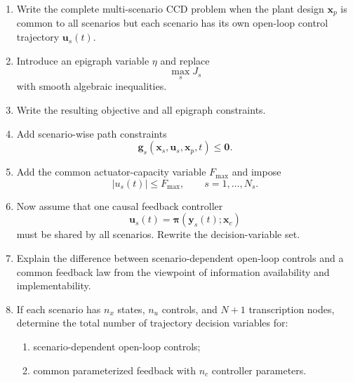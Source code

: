 \begin{enumerate}
    \item Write the complete multi-scenario CCD problem when the plant
    design $\mathbf{x}_p$ is common to all scenarios but each scenario has
    its own open-loop control trajectory $\mathbf{u}_s(t)$.

    \item Introduce an epigraph variable $\eta$ and replace
    \begin{equation}
    \max_s J_s
    \end{equation}
    with smooth algebraic inequalities.

    \item Write the resulting objective and all epigraph constraints.

    \item Add scenario-wise path constraints
    \begin{equation}
    \mathbf{g}_s
    \left(
    \mathbf{x}_s,
    \mathbf{u}_s,
    \mathbf{x}_p,
    t
    \right)
    \leq\mathbf{0}.
    \end{equation}

    \item Add the common actuator-capacity variable $F_{\max}$ and impose
    \begin{equation}
    |u_s(t)|\leq F_{\max},
    \qquad
    s=1,\ldots,N_s.
    \end{equation}

    \item Now assume that one causal feedback controller
    \begin{equation}
    \mathbf{u}_s(t)
    =
    \boldsymbol{\pi}
    \left(
    \mathbf{y}_s(t);
    \mathbf{x}_c
    \right)
    \end{equation}
    must be shared by all scenarios. Rewrite the decision-variable set.

    \item Explain the difference between scenario-dependent open-loop
    controls and a common feedback law from the viewpoint of information
    availability and implementability.

    \item If each scenario has $n_x$ states, $n_u$ controls, and $N+1$
    transcription nodes, determine the total number of trajectory decision
    variables for:
    \begin{enumerate}
        \item scenario-dependent open-loop controls;
        \item common parameterized feedback with $n_c$ controller parameters.
    \end{enumerate}
\end{enumerate}


